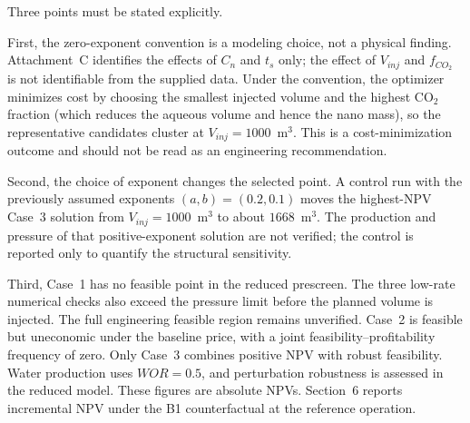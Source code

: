 Three points must be stated explicitly.

First, the zero-exponent convention is a modeling choice, not a physical
finding. Attachment~C identifies the effects of $C_n$ and $t_s$ only; the
effect of $V_{inj}$ and $f_{CO_2}$ is not identifiable from the supplied data.
Under the convention, the optimizer minimizes cost by choosing the smallest
injected volume and the highest CO$_2$ fraction (which reduces the aqueous
volume and hence the nano mass), so the representative candidates cluster at
$V_{inj}=1000$~m$^3$. This is a cost-minimization outcome and should not be
read as an engineering recommendation.

Second, the choice of exponent changes the selected point. A control run with
the previously assumed exponents $(a,b)=(0.2,0.1)$ moves the highest-NPV
Case~3 solution from $V_{inj}=1000$~m$^3$ to about $1668$~m$^3$. The
production and pressure of that positive-exponent solution are not verified;
the control is reported only to quantify the structural sensitivity.

Third, Case~1 has no feasible point in the reduced prescreen. The three
low-rate numerical checks also exceed the pressure limit before the planned
volume is injected. The full engineering feasible region remains unverified. Case~2 is
feasible but uneconomic under the baseline price, with a joint
feasibility--profitability frequency of zero. Only Case~3 combines positive
NPV with robust feasibility. Water production uses $WOR=0.5$, and perturbation robustness is assessed
in the reduced model. These figures are absolute NPVs. Section~6 reports
incremental NPV under the B1 counterfactual at the reference operation.
